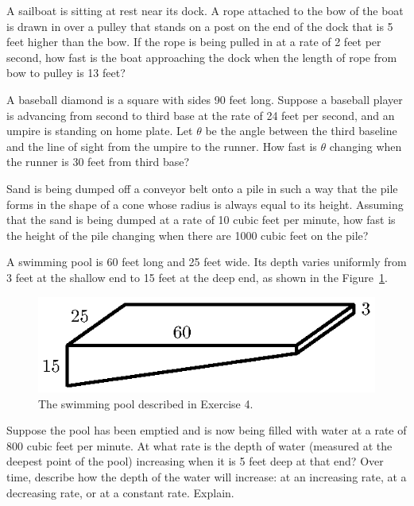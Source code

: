 \begin{exercises} 
	\item A sailboat is sitting at rest near its dock.  A rope attached to the bow of the boat is drawn in over a pulley that stands on a post on the  end of the dock that is 5 feet higher than the bow.  If the rope is being pulled in at a rate of 2 feet per second, how fast is the boat approaching the dock when the length of rope from bow to pulley is 13 feet?
	
	\item A baseball diamond is a square with sides 90 feet long.  Suppose a baseball player is advancing from second to third base at the rate of 24 feet per second, and an umpire is standing on home plate.  Let  $\theta$ be the angle between the third baseline and the line of sight from the umpire to the runner.  How fast is $\theta$ changing when the runner is 30 feet from third base?
	
	\item Sand is being dumped off a conveyor belt onto a pile in such a way that the pile forms in the shape of a cone whose radius is always equal to its height.  Assuming that the sand is being dumped at a rate of 10 cubic feet per minute, how fast is the height of the pile changing when there are 1000 cubic feet on the pile?
	
	\item A swimming pool is 60 feet long and 25 feet wide. Its depth varies uniformly from 3 feet at the shallow end to 15 feet at the deep end, as shown in the Figure~\ref{F:3.5.Ez3}.
\begin{figure}[h]
\begin{center}
\includegraphics{figures/3_5_Ez3.eps}
\caption{The swimming pool described in Exercise 4.} \label{F:3.5.Ez3}
\end{center}
\end{figure}
Suppose the pool has been emptied and is now being filled with water at a rate of 800 cubic feet per minute. At what rate is the depth of water (measured at the deepest point of the pool) increasing when it is 5 feet deep at that end?  Over time, describe how the depth of the water will increase:  at an increasing rate, at a decreasing rate, or at a constant rate.  Explain.

\end{exercises}
\afterexercises